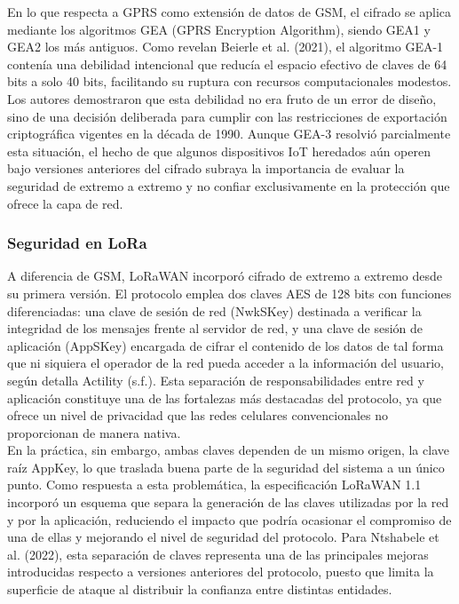 \documentclass[12pt,a4paper]{article}
\begin{document}
	En lo que respecta a GPRS como extensión de datos de GSM, el cifrado se aplica mediante los algoritmos GEA (GPRS Encryption Algorithm), siendo GEA1 y GEA2 los más antiguos. Como revelan Beierle et al. (2021), el algoritmo GEA-1 contenía una debilidad intencional que reducía el espacio efectivo de claves de 64 bits a solo 40 bits, facilitando su ruptura con recursos computacionales modestos. Los autores demostraron que esta debilidad no era fruto de un error de diseño, sino de una decisión deliberada para cumplir con las restricciones de exportación criptográfica vigentes en la década de 1990. Aunque GEA-3 resolvió parcialmente esta situación, el hecho de que algunos dispositivos IoT heredados aún operen bajo versiones anteriores del cifrado subraya la importancia de evaluar la seguridad de extremo a extremo y no confiar exclusivamente en la protección que ofrece la capa de red.

	\subsubsection{Seguridad en LoRa}

	A diferencia de GSM, LoRaWAN incorporó cifrado de extremo a extremo desde su primera versión. El protocolo emplea dos claves AES de 128 bits con funciones diferenciadas: una clave de sesión de red (NwkSKey) destinada a verificar la integridad de los mensajes frente al servidor de red, y una clave de sesión de aplicación (AppSKey) encargada de cifrar el contenido de los datos de tal forma que ni siquiera el operador de la red pueda acceder a la información del usuario, según detalla Actility (s.f.). Esta separación de responsabilidades entre red y aplicación constituye una de las fortalezas más destacadas del protocolo, ya que ofrece un nivel de privacidad que las redes celulares convencionales no proporcionan de manera nativa.\\

	En la práctica, sin embargo, ambas claves dependen de un mismo origen, la clave raíz AppKey, lo que traslada buena parte de la seguridad del sistema a un único punto. Como respuesta a esta problemática, la especificación LoRaWAN 1.1 incorporó un esquema que separa la generación de las claves utilizadas por la red y por la aplicación, reduciendo el impacto que podría ocasionar el compromiso de una de ellas y mejorando el nivel de seguridad del protocolo. Para Ntshabele et al. (2022), esta separación de claves representa una de las principales mejoras introducidas respecto a versiones anteriores del protocolo, puesto que limita la superficie de ataque al distribuir la confianza entre distintas entidades.\\
\end{document}
